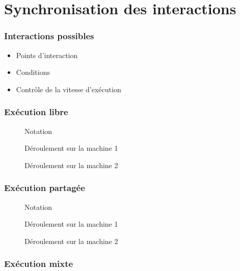 \documentclass[]{beamer}
\begin{document}
\section{Synchronisation des interactions}
\begin{frame}
\frametitle{Interactions possibles}
\Large
\begin{itemize}
	\item<1> Points d'interaction
	\item<2> Conditions
	\item<3> Contrôle de la vitesse d'exécution 
\end{itemize}
\end{frame}


\begin{frame}
\frametitle{Exécution libre}
\begin{figure}
    \centering
    \begin{tikzpicture}
    
    \end{tikzpicture}
    \caption{Notation}
\end{figure}
\begin{figure}
    \centering
    \begin{tikzpicture}
    
    \end{tikzpicture}
    \caption{Déroulement sur la machine 1}
\end{figure}
\begin{figure}
    \centering
    \begin{tikzpicture}
    
    \end{tikzpicture}
    \caption{Déroulement sur la machine 2}
\end{figure}
\end{frame}
\begin{frame}
\frametitle{Exécution partagée}
\begin{figure}
    \centering
    \begin{tikzpicture}
    
    \end{tikzpicture}
    \caption{Notation}
\end{figure}
\begin{figure}
    \centering
    \begin{tikzpicture}
    
    \end{tikzpicture}
    \caption{Déroulement sur la machine 1}
\end{figure}
\begin{figure}
    \centering
    \begin{tikzpicture}
    
    \end{tikzpicture}
    \caption{Déroulement sur la machine 2}
\end{figure}
\end{frame}
\begin{frame}
\frametitle{Exécution mixte}
\end{frame}
\end{document}
